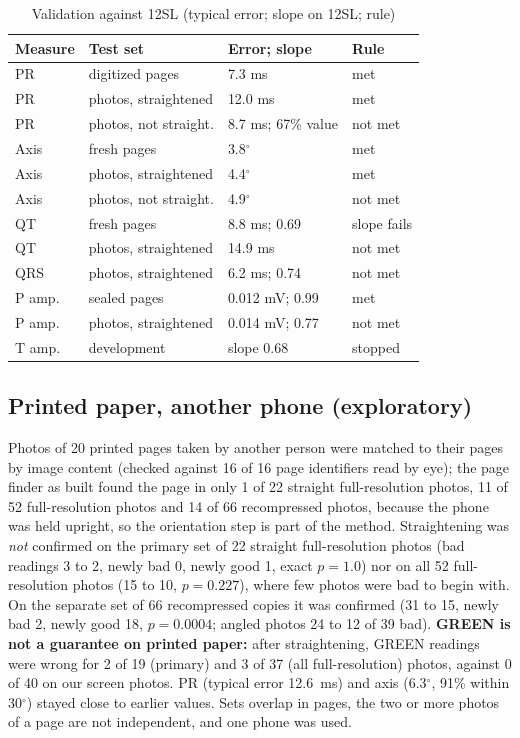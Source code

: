 \documentclass[conference]{IEEEtran}
\begin{document}
\begin{table}[t]
\caption{Validation against 12SL (typical error; slope on 12SL; rule)}
\label{tab:valid}
\centering
\small
\begin{tabular}{llll}
\toprule
Measure & Test set & Error; slope & Rule \\
\midrule
PR & digitized pages & 7.3 ms & met \\
PR & photos, straightened & 12.0 ms & met \\
PR & photos, not straight. & 8.7 ms; 67\% value & not met \\
Axis & fresh pages & 3.8$^\circ$ & met \\
Axis & photos, straightened & 4.4$^\circ$ & met \\
Axis & photos, not straight. & 4.9$^\circ$ & not met \\
QT & fresh pages & 8.8 ms; 0.69 & slope fails \\
QT & photos, straightened & 14.9 ms & not met \\
QRS & photos, straightened & 6.2 ms; 0.74 & not met \\
P amp. & sealed pages & 0.012 mV; 0.99 & met \\
P amp. & photos, straightened & 0.014 mV; 0.77 & not met \\
T amp. & development & slope 0.68 & stopped \\
\bottomrule
\end{tabular}
\end{table}

\subsection{Printed paper, another phone (exploratory)}
Photos of 20 printed pages taken by another person were matched to their pages by image content (checked against 16 of 16 page identifiers read by eye); the page finder as built found the page in only 1 of 22 straight full-resolution photos, 11 of 52 full-resolution photos and 14 of 66 recompressed photos, because the phone was held upright, so the orientation step is part of the method. Straightening was \emph{not} confirmed on the primary set of 22 straight full-resolution photos (bad readings 3 to 2, newly bad 0, newly good 1, exact $p=1.0$) nor on all 52 full-resolution photos (15 to 10, $p=0.227$), where few photos were bad to begin with. On the separate set of 66 recompressed copies it was confirmed (31 to 15, newly bad 2, newly good 18, $p=0.0004$; angled photos 24 to 12 of 39 bad). \textbf{GREEN is not a guarantee on printed paper:} after straightening, GREEN readings were wrong for 2 of 19 (primary) and 3 of 37 (all full-resolution) photos, against 0 of 40 on our screen photos. PR (typical error 12.6~ms) and axis (6.3$^\circ$, 91\% within 30$^\circ$) stayed close to earlier values. Sets overlap in pages, the two or more photos of a page are not independent, and one phone was used.
\end{document}
